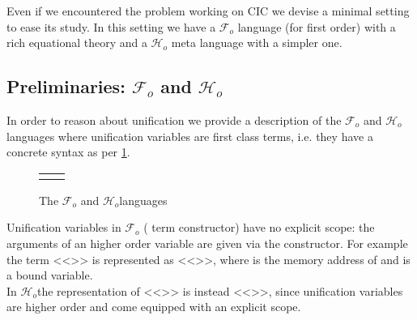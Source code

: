 \documentclass[sigconf,natbib=false,review]{acmart}
\newcommand{\Fo}{\texorpdfstring{\ensuremath{\mathcal{F}_{\!o}\xspace}}{Fo}} %
\newcommand{\Ho}{\texorpdfstring{\ensuremath{\mathcal{H}_o}\xspace}{Ho}}
\begin{document}
Even if we encountered the problem working on CIC we devise
a minimal setting to ease its study. In this setting we have
a \Fo{} language (for first order) with a rich equational
theory and a \Ho{} meta language with a simpler one.


\subsection{Preliminaries: \Fo{} and \Ho{}}

In order to reason about unification we provide a description of the
\Fo{} and \Ho languages where unification variables
are first class terms, i.e. they have a concrete syntax as
per \cref{code:common-terms}.
%
{
\setlength{\abovecaptionskip}{0pt}
\setlength{\belowcaptionskip}{-13pt}
\begin{figure}[b] %
  \begin{tabular}{ll}
  \begin{minipage}{0.21\textwidth}
   {code/fo_tm}
  \end{minipage}
  &
  \begin{minipage}{0.24\textwidth}
   {code/ho_tm}
  \end{minipage}
  \end{tabular}\vspace{4pt}
  \caption{The \Fo{} and \Ho languages}\vspace{0.3em}
  \label{code:common-terms}
\end{figure}
}
Unification variables
in \Fo{} ( term constructor) have no explicit scope:
the arguments of an higher order variable are given via the 
constructor. For example the term <<>> is represented as
<<>>, where  is the memory address
of  and  is a bound variable.\\
In \Ho the representation of <<>> is instead <<>>,
since unification variables are higher order and come equipped with an
explicit scope.
%
\end{document}
